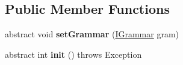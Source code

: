 \subsection*{Public Member Functions}
\begin{DoxyCompactItemize}
\item 
\hypertarget{classcontext_free_1_1scanner_1_1_l_r0_a992106eaf8f4e88b8a60e5f96518b7a7}{abstract void {\bfseries set\-Grammar} (\hyperlink{interfacecontext_free_1_1grammar_1_1_i_grammar}{I\-Grammar} gram)}\label{classcontext_free_1_1scanner_1_1_l_r0_a992106eaf8f4e88b8a60e5f96518b7a7}

\item 
\hypertarget{classcontext_free_1_1scanner_1_1_l_r0_a6d4b6d0e324341b410e67778d9c9066d}{abstract int {\bfseries init} ()  throws Exception}\label{classcontext_free_1_1scanner_1_1_l_r0_a6d4b6d0e324341b410e67778d9c9066d}


\end{DoxyCompactItemize}
